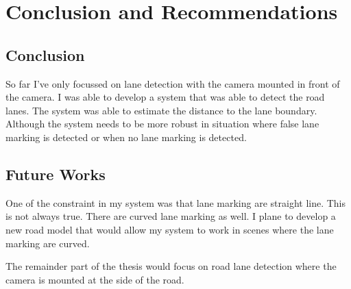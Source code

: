 \setlength{\footskip}{8mm}
\chapter{ Conclusion and Recommendations } \label{sec:conclusion}

\section{Conclusion}

So far I've only focussed on lane detection with the camera mounted in front of 
the camera. I was able to develop a system that was able to detect the road 
lanes. The system was able to estimate the distance to the lane boundary. 
Although the system needs to be more robust in situation where false lane 
marking is detected or when no lane marking is detected.  



\section{Future Works}
One of the constraint in my system was that lane marking are straight line. This 
is not always true. There are curved lane marking as well. I plane to develop a 
new road model that would allow my system to work in scenes where the lane 
marking are curved. 

The remainder part of the thesis would focus on road lane detection where the 
camera is mounted at the side of the road. 